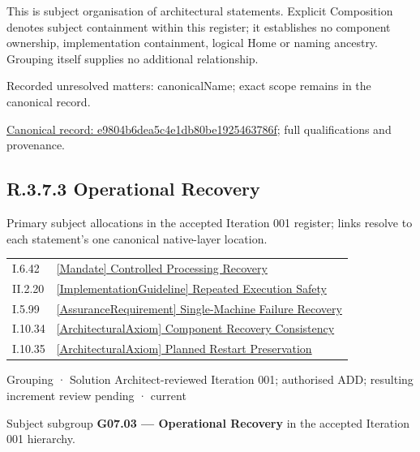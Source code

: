 This is subject organisation of architectural statements. Explicit Composition denotes subject containment within this register; it establishes no component ownership, implementation containment, logical Home or naming ancestry. Grouping itself supplies no additional relationship.


{\small Recorded unresolved matters: canonicalName; exact scope remains in the canonical record.}\par
{\footnotesize \href{../../../../continuum/grouping/e9804b6dea5c4e1db80be1925463786f.md}{Canonical record: e9804b6dea5c4e1db80be1925463786f}; full qualifications and provenance.}\par
\subsection*{R.3.7.3 Operational Recovery}
\label{navigation:R.3.7.3}

Primary subject allocations in the accepted Iteration 001 register; links resolve to each statement’s one canonical native-layer location.\par
\begin{longtable}{p{.22\linewidth}p{.73\linewidth}}
I.6.42 & \hyperref[element:014a4549398d49ee81eadb7108598f48]{[Mandate] Controlled Processing Recovery} \\
II.2.20 & \hyperref[element:be3bd95296c2427a870980a0e12adb41]{[ImplementationGuideline] Repeated Execution Safety} \\
I.5.99 & \hyperref[element:0d13da9390a3438ca887a4293bb034b9]{[AssuranceRequirement] Single-Machine Failure Recovery} \\
I.10.34 & \hyperref[element:545465b03f794a509c932bd3126fbe57]{[ArchitecturalAxiom] Component Recovery Consistency} \\
I.10.35 & \hyperref[element:0ce24ee595a445e5b1a95e54aa9f1eac]{[ArchitecturalAxiom] Planned Restart Preservation} \\
\end{longtable}
\label{element:8609b046777c4a8ab4d5cafb30e34d04}
{\small Grouping · Solution Architect-reviewed Iteration 001; authorised ADD; resulting increment review pending · current}\par

Subject subgroup \textbf{G07.03 — Operational Recovery} in the accepted Iteration 001 hierarchy.



